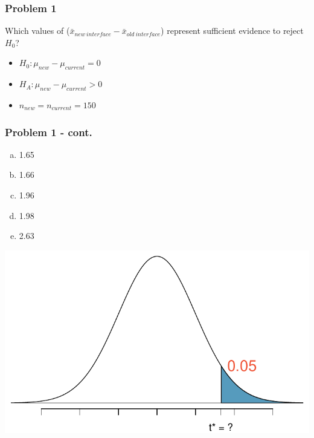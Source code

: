 \documentclass[11pt,containsverbatim,handout,xcolor=xelatex,dvipsnames,table]{beamer}
\newcommand{\solnMult}[1]{#1}
\begin{document}
\begin{frame}
\frametitle{Problem 1}

Which values of ($\bar{x}_{new~interface} - \bar{x}_{old~interface}$) represent sufficient 
evidence to reject $H_0$?

\begin{itemize}
\item[] $H_0: \mu_{new} - \mu_{current} = 0$
\item[] $H_A: \mu_{new} - \mu_{current} > 0$
\item[] $n_{new} = n_{current} = 150$
\end{itemize}

\end{frame}


\begin{frame}
\frametitle{Problem 1 - cont.}


{
\begin{enumerate}[(a)]
\item 1.65
\item \solnMult{1.66}
\item 1.96
\item 1.98
\item 2.63
\end{enumerate}
}
{
\includegraphics[width=\textwidth]{figures/med_hist_surveys/power_t_star_clicker.pdf}
}

\end{frame}
\end{document}
